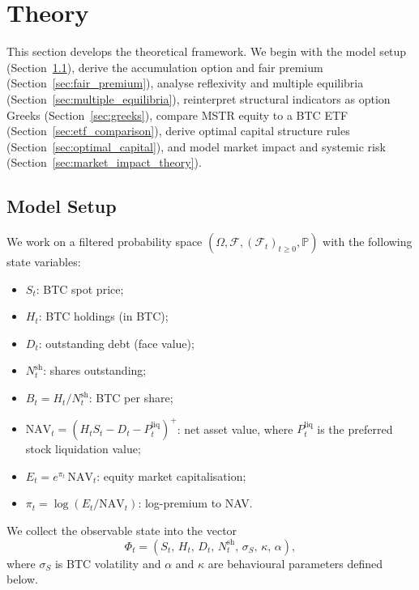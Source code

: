 
\section{Theory}\label{sec:theory}

This section develops the theoretical framework.  We begin with the model
setup (Section~\ref{sec:setup}), derive the accumulation option and fair
premium (Section~\ref{sec:fair_premium}), analyse reflexivity and multiple
equilibria (Section~\ref{sec:multiple_equilibria}), reinterpret structural
indicators as option Greeks (Section~\ref{sec:greeks}), compare MSTR equity
to a BTC ETF (Section~\ref{sec:etf_comparison}), derive optimal capital
structure rules (Section~\ref{sec:optimal_capital}), and model market impact
and systemic risk (Section~\ref{sec:market_impact_theory}).

\subsection{Model Setup}\label{sec:setup}

We work on a filtered probability space
$(\Omega,\mathcal{F},(\mathcal{F}_t)_{t\ge 0},\mathbb{P})$ with the
following state variables:
\begin{itemize}
  \item $S_t$: BTC spot price;
  \item $H_t$: BTC holdings (in BTC);
  \item $D_t$: outstanding debt (face value);
  \item $N_t^{\mathrm{sh}}$: shares outstanding;
  \item $B_t = H_t / N_t^{\mathrm{sh}}$: BTC per share;
  \item $\mathrm{NAV}_t = (H_t S_t - D_t - P_t^{\mathrm{liq}})^+$: net asset
        value, where $P_t^{\mathrm{liq}}$ is the preferred stock liquidation
        value;
  \item $E_t = e^{\pi_t}\,\mathrm{NAV}_t$: equity market capitalisation;
  \item $\pi_t = \log(E_t / \mathrm{NAV}_t)$: log-premium to NAV.
\end{itemize}

We collect the observable state into the vector
\begin{equation}
  \label{eq:state_vector}
  \Phi_t = (S_t,\, H_t,\, D_t,\, N_t^{\mathrm{sh}},\, \sigma_S,\, \kappa,\, \alpha),
\end{equation}
where $\sigma_S$ is BTC volatility and $\alpha$ and $\kappa$ are behavioural
parameters defined below.


